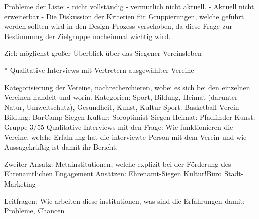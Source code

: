 Probleme der Liste: 
- nicht vollständig
- vermutlich nicht aktuell. 
- Aktuell nicht erweiterbar - Die Diskussion der Kriterien für Gruppierungen, welche geführt werden sollten wird in den Design Prozess verschoben, da diese Frage zur Bestimmung der Zielgruppe nocheinmal wichtig wird. 

Ziel: möglichst großer Überblick über das Siegener Vereinsleben

* Qualitative Interviews mit Vertretern ausgewählter Vereine

Kategorisierung der Vereine, nachrecherchieren, wobei es sich bei den einzelnen Vereinen handelt und worin. Kategorien: Sport, Bildung, Heimat (darunter Natur, Umweltschutz), Gesundheit, Kunst, Kultur
Sport: Basketball Verein
Bildung: BarCamp Siegen
Kultur: Soroptimist Siegen
Heimat: Pfadfinder
Kunst: Gruppe 3/55
Qualitative Interviews mit den Frage: Wie funktionieren die Vereine, welche Erfahrung hat die interviewte Person mit dem Verein und wie Aussagekräftig ist damit ihr Bericht. 

Zweiter Ansatz:
Metainstitutionen, welche explizit bei der Förderung des Ehrenamtlichen Engagement Ansätzen:
Ehrenamt-Siegen
Kultur!Büro
Stadt-Marketing

Leitfragen: Wie arbeiten diese institutionen, was sind die Erfahrungen damit; Probleme, Chancen